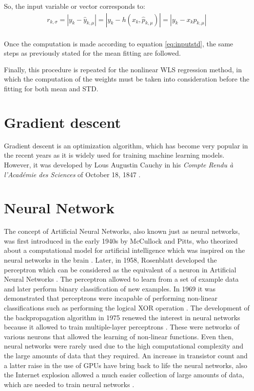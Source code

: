 \documentclass[a4paper, report, oneside, UKenglish]{memoir}
\begin{document}
So, the input variable or vector corresponds to:
\begin{equation}\label{eq:inputstd}
\begin{split}
    r_{k,\sigma} = |y_k - \hat{y}_{k,\mu}| = |y_k - h(x_{k},\hat{p}_{k,\mu})| = |y_k - x_{k}p_{k,\mu}|\\
\end{split}
\end{equation}

Once the computation is made according to equation \eqref{eq:inputstd}, the same steps as previously stated for the mean fitting are followed. 

Finally, this procedure is repeated for the nonlinear WLS regression method, in which the computation of the weights must be taken into consideration before the fitting for both mean and STD. 


\section{Gradient descent}

Gradient descent is an optimization algorithm, which has become very popular in the recent years as it is widely used for training machine learning models. However, it was developed by Lous Augustin Cauchy in his \textit{Compte Rendu à l’Académie des Sciences} of October 18, 1847 \cite{cauchy}. 



\section{Neural Network}
The concept of Artificial Neural Networks, also known just as neural networks, was first introduced in the early 1940s by McCullock and Pitts, who theorized about a computational model for artificial intelligence which was inspired on the neural networks in the brain \cite{mcculloch_logical_1943}. Later, in 1958, Rosenblatt developed the perceptron which can be considered as the equivalent of a neuron in Artificial Neural Networks \cite{rosenblatt_perceptron_1958}. The perceptron allowed to learn from a set of example data and later perform binary classification of new examples. In 1969 it was demonstrated that perceptrons were incapable of performing non-linear classifications such as performing the logical XOR operation \cite{minsky69perceptrons}. The development of the backpropagation algorithm in 1975 renewed the interest in neural networks because it allowed to train multiple-layer perceptrons \cite{werbos}. These were networks of various neurons that allowed the learning of non-linear functions. Even then, neural networks were rarely used due to the high computational complexity and the large amounts of data that they required. An increase in transistor count and a latter raise in the use of GPUs have bring back to life the neural networks, also the Internet explosion allowed a much easier collection of large amounts of data, which are needed to train neural networks \cite{aggarwal_neural_2018}.
\end{document}
